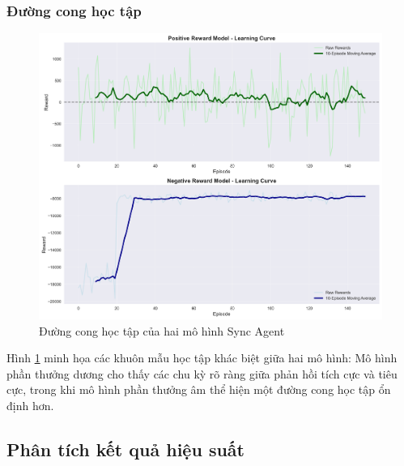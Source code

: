 \subsubsection{Đường cong học tập}

\begin{figure}[!htp]
    \centering
    \includegraphics[width=\textwidth]{figures/sync_learning_curves.png}
    \caption{Đường cong học tập của hai mô hình Sync Agent}
    \label{fig:sync_learning_curves}
\end{figure}
Hình \ref{fig:sync_learning_curves} minh họa các khuôn mẫu học tập khác biệt
giữa hai mô hình: Mô hình phần thưởng dương cho thấy các chu kỳ rõ ràng giữa phản hồi tích cực và tiêu cực, trong khi mô hình phần thưởng âm thể hiện một đường cong học tập ổn định hơn.
\newpage
\subsection{Phân tích kết quả hiệu suất}

